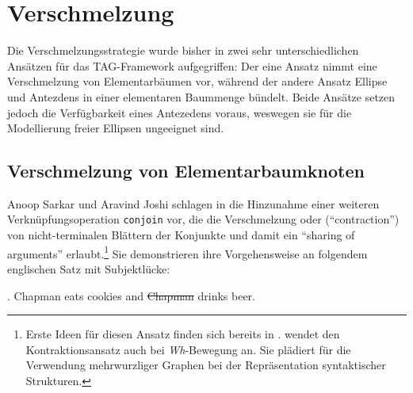 \section{Verschmelzung}

Die Verschmelzungsstrategie wurde bisher in zwei sehr unterschiedlichen Ansätzen für das TAG-Framework aufgegriffen: Der eine Ansatz nimmt eine Verschmelzung von Elementarbäumen vor, während der andere Ansatz Ellipse und Antezdens in einer elementaren Baummenge bündelt. Beide Ansätze setzen jedoch die Verfügbarkeit eines Antezedens voraus, weswegen sie für die Modellierung freier Ellipsen ungeeignet sind. 

\subsection{Verschmelzung von Elementarbaumknoten}

Anoop Sarkar und Aravind Joshi schlagen in \cite{Sarkar:Joshi:96,Sarkar:Joshi:97} die Hinzunahme einer weiteren Verknüpfungsoperation {\tt conjoin} vor, die die Verschmelzung oder  ("`contraction"') von nicht-terminalen Blättern der Konjunkte und damit ein "`sharing of arguments"' erlaubt.\footnote{Erste Ideen für diesen Ansatz finden sich bereits in \cite{Joshi:Schabes:91}. \cite{Chen-Main:06} wendet den Kontraktionsansatz auch bei \textit{Wh}-Bewegung an. Sie plädiert für die Verwendung mehrwurzliger Graphen bei der Repräsentation syntaktischer Strukturen.} Sie demonstrieren ihre Vorgehensweise an folgendem englischen Satz mit Subjektlücke:

\ex. \label{ex-contraction-1} Chapman eats cookies and \sout{Chapman} drinks beer.\\
\cite[(7)]{Sarkar:Joshi:97}

